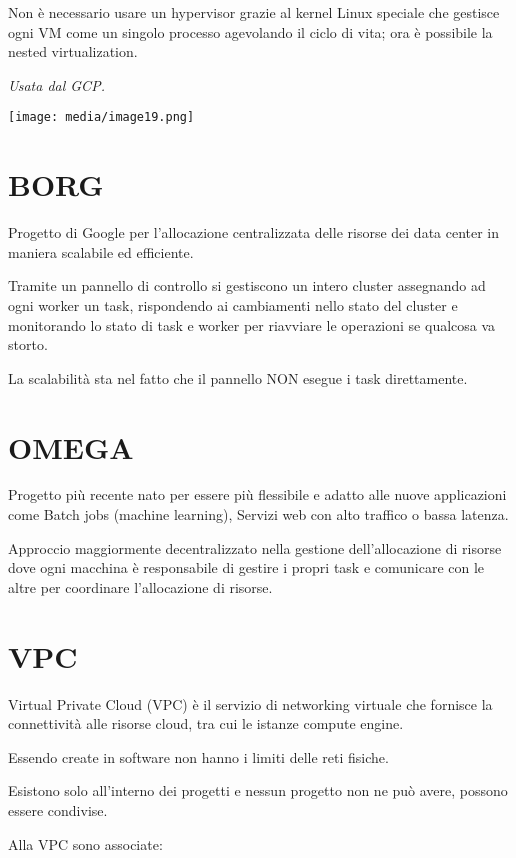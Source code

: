 Non è necessario usare un hypervisor grazie al kernel Linux speciale che
gestisce ogni VM come un singolo processo agevolando il ciclo di vita;
ora è possibile la nested virtualization.

\emph{Usata dal GCP.}

\texttt{[image: media/image19.png]}

\section{BORG}\label{borg}

Progetto di Google per l'allocazione centralizzata delle risorse dei
data center in maniera scalabile ed efficiente.

Tramite un pannello di controllo si gestiscono un intero cluster
assegnando ad ogni worker un task, rispondendo ai cambiamenti nello
stato del cluster e monitorando lo stato di task e worker per riavviare
le operazioni se qualcosa va storto.

La scalabilità sta nel fatto che il pannello NON esegue i task
direttamente.

\section{OMEGA}\label{omega}

Progetto più recente nato per essere più flessibile e adatto alle nuove
applicazioni come Batch jobs (machine learning), Servizi web con alto
traffico o bassa latenza.

Approccio maggiormente decentralizzato nella gestione dell'allocazione
di risorse dove ogni macchina è responsabile di gestire i propri task e
comunicare con le altre per coordinare l'allocazione di risorse.

\section{VPC}\label{vpc}

Virtual Private Cloud (VPC) è il servizio di networking virtuale che
fornisce la connettività alle risorse cloud, tra cui le istanze compute
engine.

Essendo create in software non hanno i limiti delle reti fisiche.

Esistono solo all'interno dei progetti e nessun progetto non ne può
avere, possono essere condivise.

Alla VPC sono associate:

